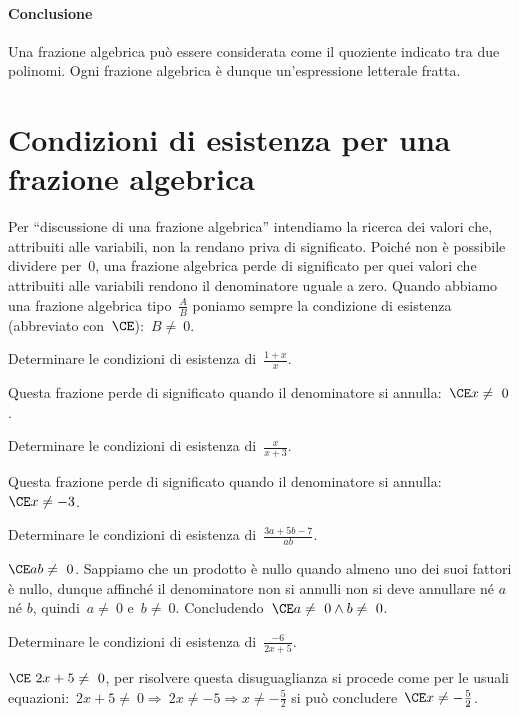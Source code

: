 \paragraph{Conclusione}Una frazione algebrica può essere considerata come il 
quoziente indicato tra due polinomi.
Ogni frazione algebrica è dunque un'espressione letterale fratta.

\section{Condizioni di esistenza per una frazione algebrica}
\label{sec:frazalg_condizioniesistenza}

Per ``discussione di una frazione algebrica'' intendiamo la ricerca dei valori 
che, attribuiti alle variabili, non la rendano priva di significato. 
Poiché non è possibile dividere per~\(0\), una frazione algebrica perde di 
significato per quei valori che attribuiti alle variabili rendono il 
denominatore uguale a zero. 
Quando abbiamo una frazione algebrica tipo~\(\frac{A}{B}\) poniamo sempre la 
condizione di esistenza (abbreviato con~\(\CE\)):~\(B\neq~0\).

 \begin{esempio}
Determinare le condizioni di esistenza di~\(\frac{1+x}{x}\).

Questa frazione perde di significato quando il denominatore si 
annulla:~\(\CE x\neq~0\).
 \end{esempio}

 \begin{esempio}
Determinare le condizioni di esistenza di~\(\frac{x}{x+3}\).

Questa frazione perde di significato quando il denominatore si 
annulla:~\(\CE x\neq -3\).
 \end{esempio}

 \begin{esempio}
Determinare le condizioni di esistenza di~\(\frac{3a+5b-7}{ab}\).

\(\CE ab\neq~0\). Sappiamo che un prodotto è nullo quando almeno uno dei suoi 
fattori è nullo, dunque affinché il denominatore non si annulli non si deve 
annullare né \(a\) né \(b\),
quindi~\(a\neq~0\) e~\(b\neq~0\). Concludendo~\(\CE a\neq~0\wedge b\neq~0\).
 \end{esempio}

 \begin{esempio}
Determinare le condizioni di esistenza di~\(\frac{-6}{2x+5}\).

\(\CE~2x+5\neq~0\), per risolvere questa disuguaglianza si procede come per le 
usuali 
equazioni:~\(2x+5\neq~0 \Rightarrow~2x\neq -5\Rightarrow x\neq -{\frac{5}{2}}\) 
si può concludere~\(\CE x\neq -{\frac{5}{2}}\).
 \end{esempio}

